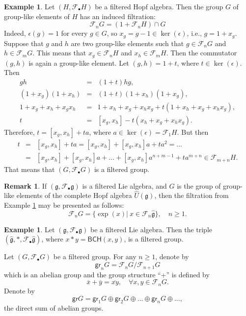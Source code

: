 \documentclass[12pt]{amsart}
\theoremstyle{definition}   %
\newtheorem{ex}[thm]{Example}
\newtheorem{rmk}[thm]{Remark}
\newcommand{\bk}{{\mathbf{k}}}
\newcommand{\gr}{\mathsf{gr}}
\newcommand{\g}{\mathfrak g}
\newcommand{\huaF}{\mathcal{F}}
\newcommand{\BCH}{\mathsf{BCH}}
\begin{document}
\begin{ex}\label{filthg}
Let $(H,\huaF_{\bullet}H)$ be a filtered Hopf algebra. Then the group $G$ of group-like elements of $H$ has an induced filtration:
$$
\huaF_n G=(1+\huaF_nH)\cap G
$$
 Indeed,
$\epsilon(g)=1$ for every $g\in G$, so
$x_g=g-1 \in \ker(\epsilon)$, i.e., $g=1+x_g$.
 Suppose that $g$ and $h$   are two group-like elements such that $g\in \huaF_nG$ and $h\in \huaF_mG$. This means that $x_g\in\huaF_n H$ and $x_h\in \huaF_m H$. Then the commutator $(g,h)$ is again a group-like element. Let $(g,h)=1+t$, where $t\in \ker(\epsilon)$. Then
\begin{eqnarray*}
 gh&=&(1+t)hg,\\
 (1+x_g)(1+x_h)&=&(1+t)(1+x_h)(1+x_g),\\
 1+x_g+x_h+x_gx_h&=&1+x_h+x_g+x_hx_g+t(1+x_h+x_g+x_hx_g),\\
 t&=&[x_g,x_h]-t(x_h+x_g+x_hx_g).
\end{eqnarray*}
     Therefore, $t=[x_g,x_h]+ta$, where $a\in\ker(\epsilon)=\huaF_1H$. But then
 \begin{eqnarray*}
     t&=&[x_g,x_h]+ta=[x_g,x_h]+[x_g,x_h]a+ta^2=\ldots
     \\&=&[x_g,x_h]+[x_g,x_h]a+\ldots+[x_g,x_h]a^{n+m-1}+ta^{m+n}\in\huaF_{m+n}H.
\end{eqnarray*}
 That means that $(G,\huaF_{\bullet}G)$ is a filtered group.
\end{ex}

\begin{rmk}\label{rmkfilt}
    If $(\g,\huaF_{\bullet}\g)$ is a filtered Lie algebra, and $G$ is the group of group-like elements of the complete Hopf algebra $\widehat U(\g)$, then the filtration from Example \ref{filthg} may be presented as follows:
    $$\huaF_nG=\{\exp(x)|\ x\in\huaF_n \widehat{\g}\},\quad n\geq 1.$$
\end{rmk}


\begin{ex}
    Let $(\g,\huaF_{\bullet}\g)$ be a filtered Lie algebra. Then the triple $(\widehat{\g},*,\huaF_{\bullet}\widehat{\g})$, where $x*y=\BCH(x,y)$, is a filtered group.
\end{ex}



  Let $(G,\huaF_{\bullet}G)$ be a filtered group.
For any $n\geq 1$, denote by
$$\gr_nG=\huaF_nG/\huaF_{n+1}G
$$
which is an abelian group and the group structure ``+'' is defined by
$$
\overline{x}+\overline{y}=\overline{xy},\quad \forall x,y\in \huaF_nG.
$$
 Denote by
$$
\gr G=\gr_1G\oplus \gr_2G\oplus\ldots\oplus \gr_nG\oplus\ldots,
$$
 the direct sum of abelian groups.
\end{document}
